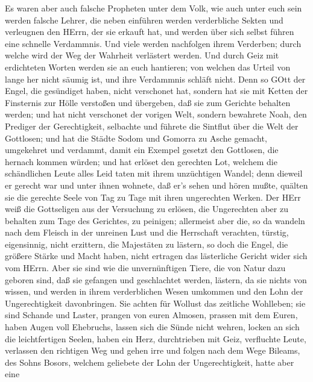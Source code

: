  Es waren aber auch falsche Propheten unter dem Volk, wie
auch unter euch sein werden falsche Lehrer, die neben einführen werden
verderbliche Sekten und verleugnen den HErrn, der sie erkauft hat, und
werden über sich selbst führen eine schnelle Verdammnis. 
Und viele werden nachfolgen ihrem Verderben; durch welche wird der Weg
der Wahrheit verlästert werden.  Und durch Geiz mit
erdichteten Worten werden sie an euch hantieren; von welchen das Urteil
von lange her nicht säumig ist, und ihre Verdammnis schläft nicht.
 Denn so GOtt der Engel, die gesündiget haben, nicht
verschonet hat, sondern hat sie mit Ketten der Finsternis zur Hölle
verstoßen und übergeben, daß sie zum Gerichte behalten werden;
 und hat nicht verschonet der vorigen Welt, sondern
bewahrete Noah, den Prediger der Gerechtigkeit, selbachte und führete
die Sintflut über die Welt der Gottlosen;  und hat die
Städte Sodom und Gomorra zu Asche gemacht, umgekehret und verdammt,
damit ein Exempel gesetzt den Gottlosen, die hernach kommen würden;
 und hat erlöset den gerechten Lot, welchem die schändlichen
Leute alles Leid taten mit ihrem unzüchtigen Wandel;  denn
dieweil er gerecht war und unter ihnen wohnete, daß er's sehen und hören
mußte, quälten sie die gerechte Seele von Tag zu Tage mit ihren
ungerechten Werken.  Der HErr weiß die Gottseligen aus der
Versuchung zu erlösen, die Ungerechten aber zu behalten zum Tage des
Gerichtes, zu peinigen;  allermeist aber die, so da wandeln
nach dem Fleisch in der unreinen Lust und die Herrschaft verachten,
türstig, eigensinnig, nicht erzittern, die Majestäten zu lästern,
 so doch die Engel, die größere Stärke und Macht haben,
nicht ertragen das lästerliche Gericht wider sich vom HErrn.
 Aber sie sind wie die unvernünftigen Tiere, die von Natur
dazu geboren sind, daß sie gefangen und geschlachtet werden, lästern, da
sie nichts von wissen, und werden in ihrem verderblichen Wesen umkommen
 und den Lohn der Ungerechtigkeit davonbringen. Sie achten
für Wollust das zeitliche Wohlleben; sie sind Schande und Laster,
prangen von euren Almosen, prassen mit dem Euren,  haben
Augen voll Ehebruchs, lassen sich die Sünde nicht wehren, locken an sich
die leichtfertigen Seelen, haben ein Herz, durchtrieben mit Geiz,
verfluchte Leute,  verlassen den richtigen Weg und gehen
irre und folgen nach dem Wege Bileams, des Sohns Bosors, welchem
geliebete der Lohn der Ungerechtigkeit,  hatte aber eine
